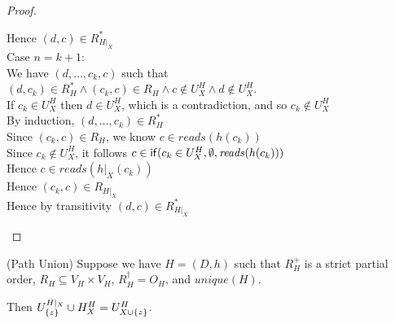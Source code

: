 \begin{proof}
\begin{tabbedproof}
\oooo Hence $(d,c) \in R^*_{H|_X}$ \\
\ooo Case $n = k+1$: \\
\oooo We have $(d, \ldots, c_k, c)$ such that $(d,c_k) \in R^*_H \land (c_k,c) \in R_H \land c \not\in U^H_X \land d \not\in U^H_X$. \\
\oooo If $c_k \in U^H_X$ then $d \in U^H_X$, which is a contradiction, and so $c_k \not\in U^H_X$ \\
\oooo By induction, $(d, \ldots, c_k) \in R^*_H$ \\
\oooo Since $(c_k,c) \in R_H$, we know $c \in \mathit{reads}(h(c_k))$ \\ 
\oooo Since $c_k \not\in U^H_X$, it follows $c \in \mathsf{if}({c_k \in U^H_X}, {\emptyset}, {\mathit{reads}(h(c_k))})$ \\
\oooo Hence $c \in \mathit{reads }(h|_X(c_k))$ \\
\oooo Hence $(c_k,c) \in R_{H|_X}$ \\
\oooo Hence by transitivity $(d, c) \in R^*_{H|_X}$ \\ 
\end{tabbedproof}
\end{proof}

\begin{lemma}{(Path Union)}
Suppose we have $H = (D,h)$ such that $R^+_H$ is a strict partial
order, $R_H \subseteq V_H \times V_H$, $R^\dagger_H = O_H$, and
$\mathit{unique}(H)$. 

Then $U^{H|_X}_{\{{z}\}} \cup H^H_X = U^H_{X \cup \{{z}\}}$.

\end{lemma}


